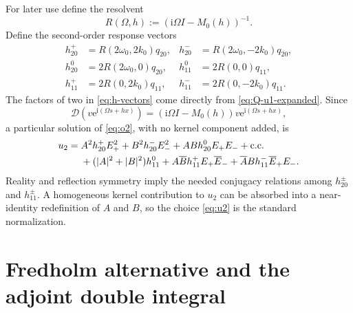 \documentclass[11pt]{article}
\newcommand{\ii}{\mathrm{i}}
\newcommand{\ee}{\mathrm{e}}
\newcommand{\cD}{\mathcal{D}}
\newcommand{\cc}{\text{c.c.}}
\begin{document}
For later use define the resolvent
\begin{equation}
  R(\Omega,h):=\left(\ii\Omega I-M_0(h)\right)^{-1}.
  \label{eq:resolvent}
\end{equation}
Define the second-order response vectors
\begin{subequations}
\label{eq:h-vectors}
\begin{align}
  h_{20}^{+}&=R(2\omega_0,2k_0)q_{20},
  &h_{20}^{-}&=R(2\omega_0,-2k_0)q_{20},\\
  h_{20}^{0}&=2R(2\omega_0,0)q_{20},
  &h_{11}^{0}&=2R(0,0)q_{11},\\
  h_{11}^{+}&=2R(0,2k_0)q_{11},
  &h_{11}^{-}&=2R(0,-2k_0)q_{11}.
\end{align}
\end{subequations}
The factors of two in \eqref{eq:h-vectors} come directly from
\eqref{eq:Q-u1-expanded}.  Since
\begin{equation}
  \cD\left(v\ee^{\ii(\Omega s+hx)}\right)
  =\left(\ii\Omega I-M_0(h)\right)v\ee^{\ii(\Omega s+hx)},
  \label{eq:D-mode}
\end{equation}
a particular solution of \eqref{eq:o2}, with no kernel component added, is
\begin{align}
u_2={}&A^2h_{20}^{+}E_+^2+B^2h_{20}^{-}E_-^2
       +ABh_{20}^{0}E_+E_-+\cc\notag\\
&+(|A|^2+|B|^2)h_{11}^{0}
  +A\overline B h_{11}^{+}E_+\overline E_-
  +\overline A B h_{11}^{-}\overline E_+E_-.
\label{eq:u2}
\end{align}
Reality and reflection symmetry imply the needed conjugacy relations among
$h_{20}^{\pm}$ and $h_{11}^{\pm}$.  A homogeneous kernel contribution to
$u_2$ can be absorbed into a near-identity redefinition of $A$ and $B$, so the
choice \eqref{eq:u2} is the standard normalization.

\section{Fredholm alternative and the adjoint double integral}
\label{sec:fredholm}
\end{document}
